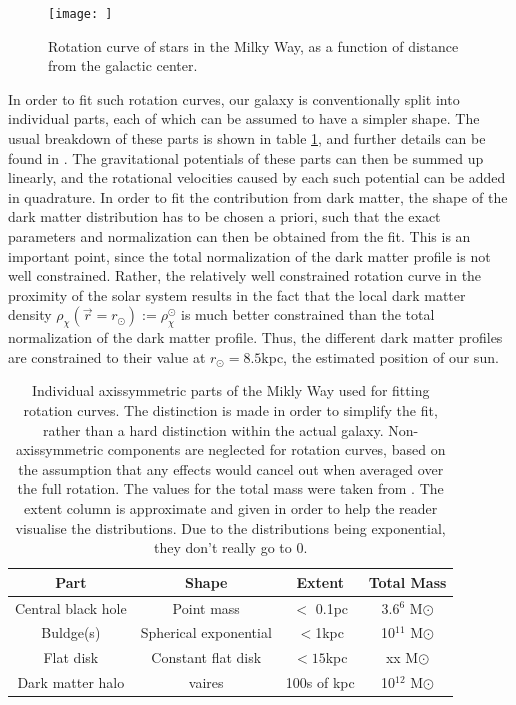 \begin{figure}[h]
    \centering
    \texttt{[image: ]}
    \caption{Rotation curve of stars in the Milky Way, as a function of distance from the galactic center.}
    \label{fig:MilkyWayRotationCurve}
\end{figure}

In order to fit such rotation curves, our galaxy is conventionally split into individual parts, each of which can be assumed to have a simpler shape. The usual breakdown of these parts is shown in table \ref{tab:MilkyWayBreakdown}, and further details can be found in \cite{Sofue_2016}. The gravitational potentials of these parts can then be summed up linearly, and the rotational velocities caused by each such potential can be added in quadrature. In order to fit the contribution from dark matter, the shape of the dark matter distribution has to be chosen a priori, such that the exact parameters and normalization can then be obtained from the fit. This is an important point, since the total normalization of the dark matter profile is not well constrained. Rather, the relatively well constrained rotation curve in the proximity of the solar system results in the fact that the local dark matter density $\rho_\chi(\vec{r}=r_\odot) := \rho_\chi^\odot$ is much better constrained than the total normalization of the dark matter profile. Thus, the different dark matter profiles are constrained to their value at $r_\odot = 8.5$kpc, the estimated position of our sun. \\
\begin{table}[h]
    \centering
    \begin{tabular}{|c|c|c|c|}
        \hline
        Part & Shape & Extent & Total Mass \\
        \hline
        Central black hole & Point mass & $<$ 0.1pc & 3.6\times 10$^6$ M$\odot$ \\
        \hline
        Buldge(s) & Spherical exponential & $<$1kpc & 10$^11$ M$\odot$ \\
        \hline
        Flat disk & Constant flat disk & $<15$kpc & xx M$\odot$ \\
        \hline
        Dark matter halo & vaires & 100s of kpc & 10$^12$ M$\odot$ \\
        \hline
    \end{tabular}
    \label{tab:MilkyWayBreakdown}
    \caption{Individual axissymmetric parts of the Mikly Way used for fitting rotation curves. The distinction is made in order to simplify the fit, rather than a hard distinction within the actual galaxy. Non-axissymmetric components are neglected for rotation curves, based on the assumption that any effects would cancel out when averaged over the full rotation. The values for the total mass were taken from \cite{Sofue_2016}. The extent column is approximate and given in order to help the reader visualise the distributions. Due to the distributions being exponential, they don't really go to 0.}

\end{table}

